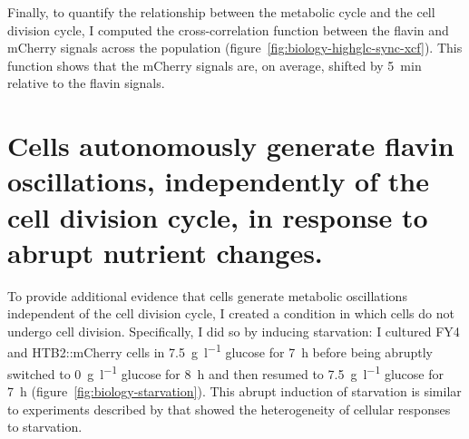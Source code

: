 Finally, to quantify the relationship between the metabolic cycle and the cell division cycle, I computed the cross-correlation function between the flavin and mCherry signals across the population (figure~\ref{fig:biology-highglc-sync-xcf}).
This function shows that the mCherry signals are, on average, shifted by \SI{5}{\minute} relative to the flavin signals.


\section[Abrupt nutrient changes]{Cells autonomously generate flavin oscillations, independently of the cell division cycle, in response to abrupt nutrient changes.}
\label{sec:biology-abrupt}

To provide additional evidence that cells generate metabolic oscillations independent of the cell division cycle, I created a condition in which cells do not undergo cell division.
Specifically, I did so by inducing starvation: I cultured FY4 and HTB2::mCherry cells in \SI{7.5}{\gram~\litre^{-1}} glucose for \SI{7}{\hour} before being abruptly switched to \SI{0}{\gram~\litre^{-1}} glucose for \SI{8}{\hour} and then resumed to \SI{7.5}{\gram~\litre^{-1}} glucose for \SI{7}{\hour} (figure~\ref{fig:biology-starvation}).
This abrupt induction of starvation is similar to experiments described by \textcite{bagameryPutativeBetHedgingStrategy2020} that showed the heterogeneity of cellular responses to starvation.

